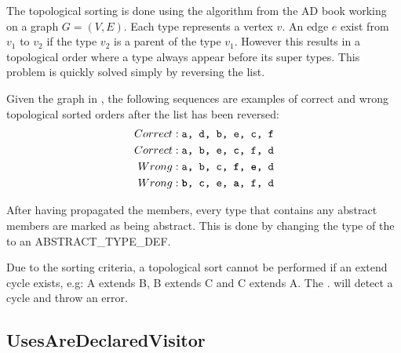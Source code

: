 The topological sorting is done using the algorithm from the AD book working on a graph $G = (V, E)$. Each type represents a vertex $v$. An edge $e$ exist from $v_1$ to $v_2$ if the type $v_2$ is a parent of the type $v_1$. However this results in a topological order where a type always appear before its super types. This problem is quickly solved simply by reversing the list.

Given the graph in \label{fig:topological}, the following sequences are examples of correct and wrong topological sorted orders after the list has been reversed:
\begin{align}
 Correct & : \texttt{a, d, b, e, c, f} \\
 Correct & : \texttt{a, b, e, c, f, d} \\
 Wrong & : \texttt{a, b, c, \textbf{f}, \textbf{e}, d} \\
 Wrong & : \texttt{\textbf{b}, c, e, \textbf{a}, f, d}
\end{align}


 
After having propagated the members, every type that contains any abstract members are marked as being abstract. This is done by changing the type of the  to an ABSTRACT\_TYPE\_DEF.

Due to the sorting criteria, a topological sort cannot be performed if an extend cycle exists, e.g: A extends B, B extends C and C extends A. The . will detect a cycle and throw an error.

\subsection{UsesAreDeclaredVisitor}
\label{sec:usesaredeclaredvisitor}

